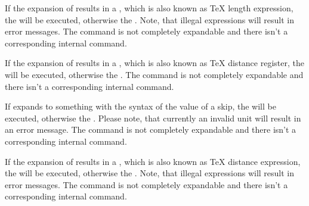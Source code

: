 \begin{Declaration}
\end{Declaration}
%
If the expansion of results in
a , which is also known as \TeX{} length expression, the
 will be executed, otherwise the . Note, that illegal expressions will
result in error messages. The command is not completely expandable and there
isn't a corresponding internal command.%
%

\begin{Declaration}
\end{Declaration}
%
If the expansion of results in
a , which is also known as \TeX{} distance register, the
 will be executed, otherwise the . The command is not completely expandable and there isn't a
corresponding internal command.%
%

\begin{Declaration}
\end{Declaration}
%
If  expands to something with
the syntax of the value of a skip, the  will be
executed, otherwise the . Please
note, that currently an invalid unit will result in an
error message. The command is not completely expandable and there isn't a
corresponding internal command.%
%

\begin{Declaration}
\end{Declaration}
%
If the expansion of results in
a , which is also known as \TeX{} distance expression, the
 will be executed, otherwise the . Note, that illegal expressions will
result in error messages. The command is not completely expandable and there
isn't a corresponding internal command.%
%


